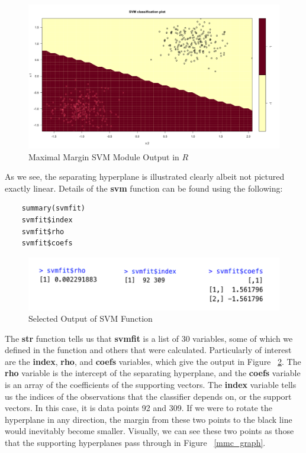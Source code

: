 \documentclass[12pt]{article}
\begin{document}
\begin{figure}
    \centering
    \includegraphics[width=5.5in]{Figures/mmc_module_output.png}
    \caption{Maximal Margin SVM Module Output in $R$}
    \label{fig_mmc_module_output}
\end{figure}
As we see, the separating hyperplane is illustrated clearly albeit not pictured exactly linear. Details of the \textbf{svm} function can be found using the following:
\begin{verbatim}
    summary(svmfit)
    svmfit$index
    svmfit$rho
    svmfit$coefs
\end{verbatim}

\begin{figure}[H]
    \centering
    \includegraphics[width=5in]{Figures/mmc_selected_output.png}
    \caption{Selected Output of SVM Function}
    \label{fig_mmc_selected_output}
\end{figure}

The \textbf{str} function tells us that \textbf{svmfit} is a list of 30 variables, some of which we defined in the function and others that were calculated. Particularly of interest are the \textbf{index}, \textbf{rho}, and \textbf{coefs} variables, which give the output in Figure ~\ref{fig_mmc_selected_output}. The \textbf{rho} variable is the intercept of the separating hyperplane, and the \textbf{coefs} variable is an array of the coefficients of the supporting vectors. The \textbf{index} variable tells us the indices of the observations that the classifier depends on, or the support vectors. In this case, it is data points 92 and 309. If we were to rotate the hyperplane in any direction, the margin from these two points to the black line would inevitably become smaller. Visually, we can see these two points as those that the supporting hyperplanes pass through in Figure ~\ref{mmc_graph}.
\end{document}
